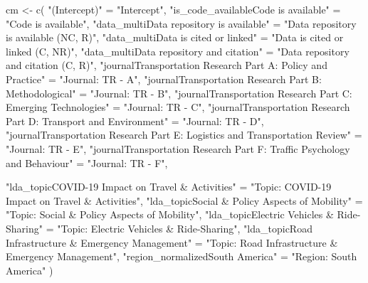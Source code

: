 \documentclass[
  authoryear,
  review,
  3p]{elsarticle}
\newenvironment{Shaded}{\begin{snugshade}}{\end{snugshade}}
\newcommand{\FunctionTok}[1]{\textcolor[rgb]{0.28,0.35,0.67}{#1}}
\newcommand{\NormalTok}[1]{\textcolor[rgb]{0.00,0.23,0.31}{#1}}
\newcommand{\OtherTok}[1]{\textcolor[rgb]{0.00,0.23,0.31}{#1}}
\newcommand{\StringTok}[1]{\textcolor[rgb]{0.13,0.47,0.30}{#1}}
\begin{document}
\begin{Shaded}
\begin{Highlighting}[]
\NormalTok{cm }\OtherTok{\textless{}{-}} \FunctionTok{c}\NormalTok{(}
  \StringTok{"(Intercept)"} \OtherTok{=} \StringTok{"Intercept"}\NormalTok{,}
  \StringTok{"is\_code\_availableCode is available"} \OtherTok{=} \StringTok{"Code is available"}\NormalTok{,}
  \StringTok{"data\_multiData repository is available"} \OtherTok{=} \StringTok{"Data repository is available (NC, R)"}\NormalTok{,}
  \StringTok{"data\_multiData is cited or linked"} \OtherTok{=} \StringTok{"Data is cited or linked (C, NR)"}\NormalTok{,}
  \StringTok{"data\_multiData repository and citation"} \OtherTok{=} \StringTok{"Data repository and citation (C, R)"}\NormalTok{,}
  \StringTok{"journalTransportation Research Part A: Policy and Practice"} \OtherTok{=} \StringTok{"Journal: TR {-} A"}\NormalTok{,}
  \StringTok{"journalTransportation Research Part B: Methodological"} \OtherTok{=} \StringTok{"Journal: TR {-} B"}\NormalTok{,}
  \StringTok{"journalTransportation Research Part C: Emerging Technologies"} \OtherTok{=} \StringTok{"Journal: TR {-} C"}\NormalTok{,}
  \StringTok{"journalTransportation Research Part D: Transport and Environment"} \OtherTok{=} \StringTok{"Journal: TR {-} D"}\NormalTok{,}
  \StringTok{"journalTransportation Research Part E: Logistics and Transportation Review"} \OtherTok{=} \StringTok{"Journal: TR {-} E"}\NormalTok{,}
  \StringTok{"journalTransportation Research Part F: Traffic Psychology and Behaviour"} \OtherTok{=} \StringTok{"Journal: TR {-} F"}\NormalTok{,}

  \StringTok{"lda\_topicCOVID{-}19 Impact on Travel \& Activities"} \OtherTok{=} \StringTok{"Topic: COVID{-}19 Impact on Travel \& Activities"}\NormalTok{,}
  \StringTok{"lda\_topicSocial \& Policy Aspects of Mobility"} \OtherTok{=} \StringTok{"Topic: Social \& Policy Aspects of Mobility"}\NormalTok{,}
  \StringTok{"lda\_topicElectric Vehicles \& Ride{-}Sharing"} \OtherTok{=} \StringTok{"Topic: Electric Vehicles \& Ride{-}Sharing"}\NormalTok{,}
  \StringTok{"lda\_topicRoad Infrastructure \& Emergency Management"} \OtherTok{=} \StringTok{"Topic: Road Infrastructure \& Emergency Management"}\NormalTok{,}
  \StringTok{"region\_normalizedSouth America"} \OtherTok{=} \StringTok{"Region: South America"}
\NormalTok{)}


\end{Highlighting}
\end{Shaded}
\end{document}
